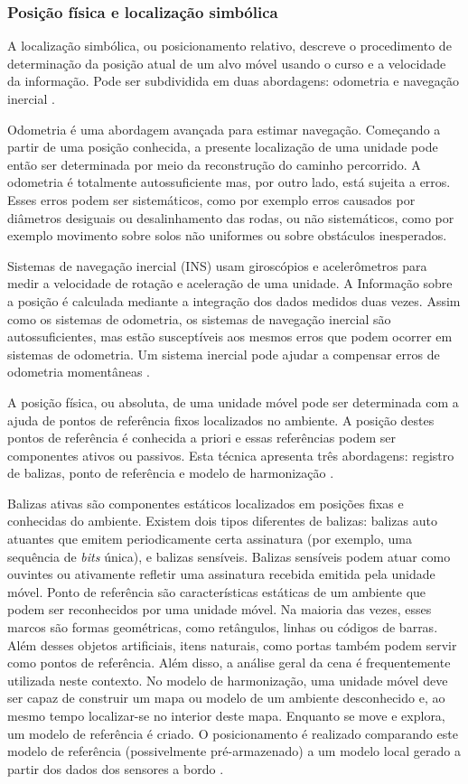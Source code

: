 \subsubsection{Posição física e localização simbólica}\label{sec:posic-fisica}
A localização simbólica, ou posicionamento relativo, descreve o procedimento de determinação da posição atual de um alvo móvel usando o curso e a velocidade da informação. Pode ser subdividida em duas abordagens: odometria e navegação inercial \cite{linde2006aspects}.

Odometria é uma abordagem avançada para estimar navegação. Começando a partir de uma posição conhecida, a presente localização de uma unidade pode então ser determinada por meio da reconstrução do caminho percorrido. A odometria é totalmente autossuficiente mas, por outro lado, está sujeita a erros. Esses erros podem ser sistemáticos, como por exemplo erros causados por diâmetros desiguais ou desalinhamento das rodas, ou não sistemáticos, como por exemplo movimento sobre solos não uniformes ou sobre obstáculos inesperados. 

Sistemas de navegação inercial (INS) usam giroscópios e acelerômetros para medir a velocidade de rotação e aceleração de uma unidade. A Informação sobre a posição é calculada mediante a integração dos dados medidos duas vezes. Assim como os sistemas de odometria, os sistemas de navegação inercial são autossuficientes, mas estão susceptíveis aos mesmos erros que podem ocorrer em sistemas de odometria. Um sistema inercial pode ajudar a compensar erros de odometria momentâneas \cite{linde2006aspects}.

A posição física, ou absoluta, de uma unidade móvel pode ser determinada com a ajuda de pontos de referência fixos localizados no ambiente. A posição destes pontos de referência é conhecida a priori e essas referências podem ser componentes ativos ou passivos. Esta técnica apresenta três abordagens: registro de balizas, ponto de referência e modelo de harmonização \cite{linde2006aspects}.

Balizas ativas são componentes estáticos localizados em posições fixas e conhecidas do ambiente. Existem dois tipos diferentes de balizas: balizas auto atuantes que emitem periodicamente certa assinatura (por exemplo, uma sequência de \textit{bits} única), e balizas sensíveis. Balizas sensíveis podem atuar como ouvintes ou ativamente refletir uma assinatura recebida emitida pela unidade móvel. Ponto de referência são características estáticas de um ambiente que podem ser reconhecidos por uma unidade móvel. Na maioria das vezes, esses marcos são formas geométricas, como retângulos, linhas ou códigos de barras. Além desses objetos artificiais, itens naturais, como portas também podem servir como pontos de referência. Além disso, a análise geral da cena é frequentemente utilizada neste contexto. No modelo de harmonização, uma unidade móvel deve ser capaz de construir um mapa ou modelo de um ambiente desconhecido e, ao mesmo tempo localizar-se no interior deste mapa. Enquanto se move e explora, um modelo de referência é criado. O posicionamento é realizado comparando este modelo de referência (possivelmente pré-armazenado) a um modelo local gerado a partir dos dados dos sensores a bordo \cite{linde2006aspects}.

